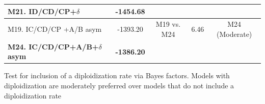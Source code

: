 \begin{supptable}
\begin{tabular}{|l|c|c|c|c|}
\textbf{M21. ID/CD/CP+$\delta$}          & \textbf{-1454.68}                                                 &             &                 &                                                                      \\ \hline
M19. IC/CD/CP +A/B asym                       & -1393.20                                                          & M19 vs. M24 & 6.46            & M24 (Moderate)                                                       \\
\textbf{M24. IC/CD/CP+A/B+$\delta$ asym} & \textbf{-1386.20}                                                 &             &                 &                                                                      \\ \hline
\end{tabular}
\caption{Test for inclusion of a diploidization rate via Bayes factors. Models with diploidization are moderately preferred over models that do not include a diploidization rate}
\label{supptable:testdiploidization}
\end{supptable}


